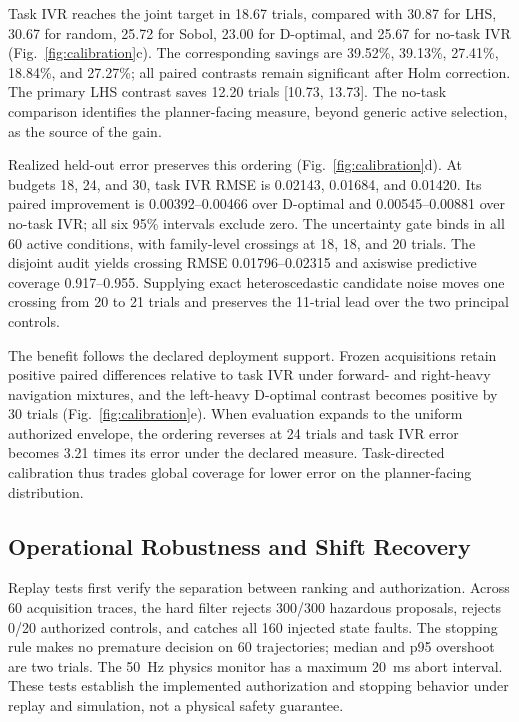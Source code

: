 \documentclass[letterpaper,10pt,conference]{ieeeconf}
\begin{document}
Task IVR reaches the joint target in 18.67 trials, compared with 30.87 for LHS,
30.67 for random, 25.72 for Sobol, 23.00 for D-optimal, and 25.67 for no-task IVR
(Fig.~\ref{fig:calibration}c). The corresponding savings are 39.52\%, 39.13\%,
27.41\%, 18.84\%, and 27.27\%; all paired contrasts remain significant after
Holm correction. The primary LHS contrast saves 12.20 trials [10.73, 13.73].
The no-task comparison identifies the planner-facing measure, beyond generic
active selection, as the source of the gain.

Realized held-out error preserves this ordering (Fig.~\ref{fig:calibration}d).
At budgets 18, 24, and 30, task IVR RMSE is 0.02143, 0.01684, and 0.01420. Its
paired improvement is 0.00392--0.00466 over D-optimal and 0.00545--0.00881 over
no-task IVR; all six 95\% intervals exclude zero. The uncertainty gate binds in
all 60 active conditions, with family-level crossings at 18, 18, and 20 trials.
The disjoint audit yields crossing RMSE 0.01796--0.02315 and axiswise predictive
coverage 0.917--0.955. Supplying exact heteroscedastic candidate noise moves one
crossing from 20 to 21 trials and preserves the 11-trial lead over the two
principal controls.

The benefit follows the declared deployment support. Frozen acquisitions retain
positive paired differences relative to task IVR under forward- and right-heavy
navigation mixtures, and the left-heavy D-optimal contrast becomes positive by
30 trials (Fig.~\ref{fig:calibration}e). When evaluation expands to the uniform
authorized envelope, the ordering reverses at 24 trials and task IVR error becomes
3.21 times its error under the declared measure. Task-directed calibration thus
trades global coverage for lower error on the planner-facing distribution.

\subsection{Operational Robustness and Shift Recovery}

Replay tests first verify the separation between ranking and authorization.
Across 60 acquisition traces, the hard filter rejects 300/300 hazardous
proposals, rejects 0/20 authorized controls, and catches all 160 injected state faults.
The stopping rule makes no premature decision on 60 trajectories; median and
p95 overshoot are two trials. The 50~Hz physics monitor has a maximum 20~ms abort
interval. These tests establish the implemented authorization and stopping
behavior under replay and simulation, not a physical safety guarantee.
\end{document}
